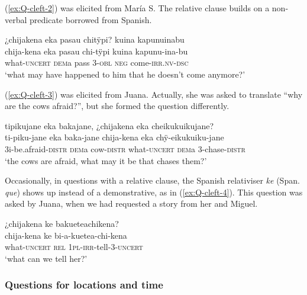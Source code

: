 (\ref{ex:Q-cleft-2}) was elicited from María S. The relative clause builds on a non-verbal predicate borrowed from Spanish.

\ea\label{ex:Q-cleft-2}
\begingl
\glpreamble ¿chijakena eka pasau chitÿpi? kuina kapunuinabu \\
\gla chija-kena eka pasau chi-tÿpi kuina kapunu-ina-bu\\
\glb what-\textsc{uncert} \textsc{dem}a pass 3-\textsc{obl} \textsc{neg} come-\textsc{irr.nv}-\textsc{dsc}\\
\glft ‘what may have happened to him that he doesn’t come anymore?’
\endgl
\trailingcitation{[rxx-e181022le]}
\xe

(\ref{ex:Q-cleft-3}) was elicited from Juana. Actually, she was asked to translate “why are the cows afraid?”, but she formed the question differently.

\ea\label{ex:Q-cleft-3}
\begingl
\glpreamble tipikujane eka bakajane, ¿chijakena eka cheikukuikujane?\\
\gla ti-piku-jane eka baka-jane chija-kena eka chÿ-eikukuiku-jane\\
\glb 3i-be.afraid-\textsc{distr} \textsc{dem}a cow-\textsc{distr} what-\textsc{uncert} \textsc{dem}a 3-chase-\textsc{distr}\\
\glft ‘the cows are afraid, what may it be that chases them?’
\endgl
\trailingcitation{[jxx-a110923l.18]}
\xe

Occasionally, in questions with a relative clause, the Spanish relativiser \textit{ke} (Span. \textit{que}) shows up instead of a demonstrative, as in (\ref{ex:Q-cleft-4}). This question was asked by Juana, when we had requested a story from her and Miguel.

\ea\label{ex:Q-cleft-4}
\begingl
\glpreamble ¿chijakena ke bakueteachikena?\\
\gla chija-kena ke bi-a-kuetea-chi-kena\\
\glb what-\textsc{uncert} \textsc{rel} 1\textsc{pl}-\textsc{irr}-tell-3-\textsc{uncert}\\
\glft ‘what can we tell her?’
\endgl
\trailingcitation{[jmx-n120429ls-x5.046]}
\xe
{}

\subsubsection{Questions for locations and time}\label{sec:Q_juchubu}

